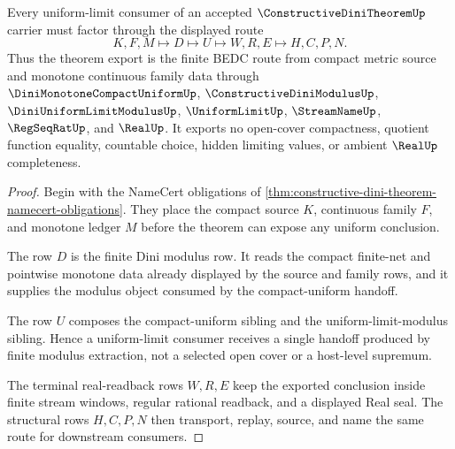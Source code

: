 \begin{theorem}
\label{thm:constructive-dini-theorem-monotone-uniform-route}
Every uniform-limit consumer of an accepted $\ConstructiveDiniTheoremUp$ carrier must factor through the displayed route
$$
K,F,M \longmapsto D \longmapsto U \longmapsto W,R,E \longmapsto H,C,P,N.
$$
Thus the theorem export is the finite BEDC route from compact metric source and monotone continuous family data through $\DiniMonotoneCompactUniformUp$, $\ConstructiveDiniModulusUp$, $\DiniUniformLimitModulusUp$, $\UniformLimitUp$, $\StreamNameUp$, $\RegSeqRatUp$, and $\RealUp$. It exports no open-cover compactness, quotient function equality, countable choice, hidden limiting values, or ambient $\RealUp$ completeness.
\end{theorem}
\begin{proof}
Begin with the NameCert obligations of \autoref{thm:constructive-dini-theorem-namecert-obligations}. They place the compact source $K$, continuous family $F$, and monotone ledger $M$ before the theorem can expose any uniform conclusion.

The row $D$ is the finite Dini modulus row. It reads the compact finite-net and pointwise monotone data already displayed by the source and family rows, and it supplies the modulus object consumed by the compact-uniform handoff.

The row $U$ composes the compact-uniform sibling and the uniform-limit-modulus sibling. Hence a uniform-limit consumer receives a single handoff produced by finite modulus extraction, not a selected open cover or a host-level supremum.

The terminal real-readback rows $W,R,E$ keep the exported conclusion inside finite stream windows, regular rational readback, and a displayed Real seal. The structural rows $H,C,P,N$ then transport, replay, source, and name the same route for downstream consumers.
\end{proof}


